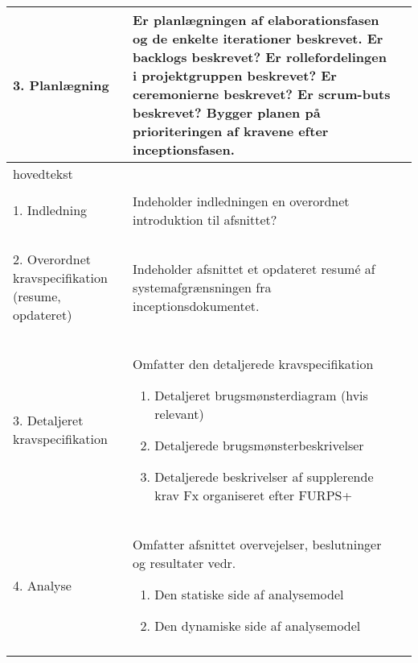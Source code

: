 \begin{center}
\begin{longtable}{|m{3.5cm}|m{10cm}|m{2.5cm}|}
\hline
\begin{flushright}
3. Planlægning
\end{flushright}
& Er planlægningen af elaborationsfasen og de enkelte iterationer beskrevet.\newline
Er backlogs beskrevet?\newline
Er rollefordelingen i projektgruppen beskrevet?\newline
Er ceremonierne beskrevet?\newline
Er scrum-buts beskrevet?\newline
Bygger planen på prioriteringen af kravene efter inceptionsfasen. & \\
\hline
hovedtekst & & \\ \hline
\begin{flushright}
1. Indledning
\end{flushright} & Indeholder indledningen en overordnet introduktion til afsnittet? &\\ \hline
\begin{flushright}
2. Overordnet kravspecifikation (resume, opdateret)
\end{flushright} & Indeholder afsnittet et opdateret resumé  af systemafgrænsningen fra inceptionsdokumentet. & \\ \hline
\begin{flushright}
3. Detaljeret kravspecifikation
\end{flushright} & 
Omfatter den detaljerede kravspecifikation \newline
\begin{enumerate}
\item Detaljeret brugsmønsterdiagram (hvis relevant)
\item Detaljerede brugsmønsterbeskrivelser 
\item Detaljerede beskrivelser af supplerende krav Fx organiseret efter FURPS+
\end{enumerate}
& \\
\hline
\begin{flushright}
4. Analyse
\end{flushright}
& Omfatter afsnittet overvejelser, beslutninger og resultater vedr. \newline
\begin{enumerate}
\item Den statiske side af analysemodel
\item Den dynamiske side af analysemodel
\end{enumerate}
& \\ \hline
\begin{flushright}

\end{flushright}
\end{longtable}
\end{center}
